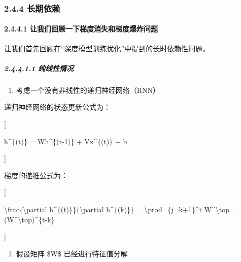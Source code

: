 \subsubsection{\texorpdfstring{\textbf{2.4.4
长期依赖}}{2.4.4 长期依赖}}\label{244-ux957fux671fux4f9dux8d56}

\paragraph{\texorpdfstring{\textbf{2.4.4.1}
\textbf{让我们回顾一下梯度消失和梯度爆炸问题}}{2.4.4.1 让我们回顾一下梯度消失和梯度爆炸问题}}\label{2441-ux8ba9ux6211ux4eecux56deux987eux4e00ux4e0bux68afux5ea6ux6d88ux5931ux548cux68afux5ea6ux7206ux70b8ux95eeux9898}

让我们首先回顾在``深度模型训练优化''中提到的长时依赖性问题。

\subparagraph{\texorpdfstring{\textbf{2.4.4.1.1
纯线性情况}}{2.4.4.1.1 纯线性情况}}\label{24411-ux7eafux7ebfux6027ux60c5ux51b5}

\begin{enumerate}
\def\labelenumi{\arabic{enumi}.}
\item
  考虑一个没有非线性的递归神经网络（RNN）
\end{enumerate}

递归神经网络的状态更新公式为：

{[}

h\^{}\{(t)\} = Wh\^{}\{(t-1)\} + Vx\^{}\{(t)\} + b

{]}


梯度的递推公式为：

{[}

\textbackslash frac\{\textbackslash partial
h\^{}\{(t)\}\}\{\textbackslash partial h\^{}\{(k)\}\} =
\textbackslash prod\_\{j=k+1\}\^{}t W\^{}\textbackslash top =
(W\^{}\textbackslash top)\^{}\{t-k\}

{]}


\begin{enumerate}
\def\labelenumi{\arabic{enumi}.}
\item
  假设矩阵 \$W\$ 已经进行特征值分解
\end{enumerate}

